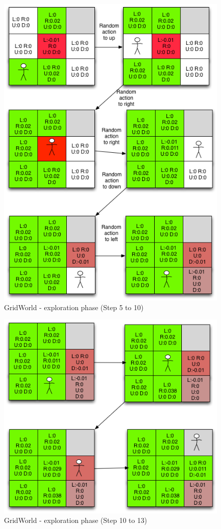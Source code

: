 \begin{figure}[h!]
\centering
\includegraphics[width=1\textwidth]{./images/mdpgrid1-3.png}
\caption{GridWorld - exploration phase (Step 5 to 10)}
\label{fig:gridworld3}
\end{figure}


\begin{figure}[h!]
\centering
\includegraphics[width=1\textwidth]{./images/mdpgrid1-4.png}
\caption{GridWorld - exploration phase (Step 10 to 13)}
\label{fig:gridworld4}
\end{figure}
\vspace*{-3in}